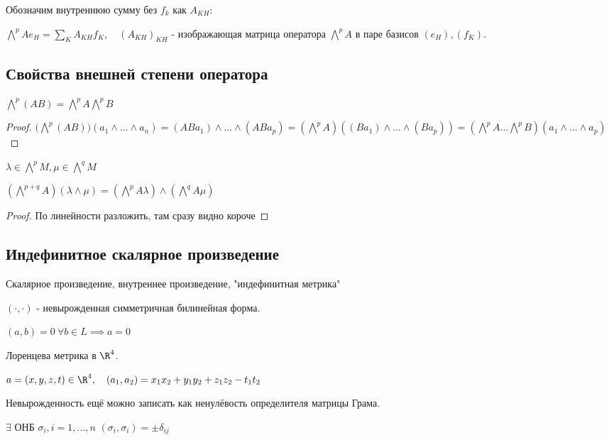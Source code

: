   Обозначим внутреннюю сумму без $f_k$ как $A_{KH}$:

  $\bigwedge^p A e_H = \sum_K A_{KH}f_K, \quad (A_{KH})_{KH}$ - изображающая матрица оператора $\bigwedge^p A$ в паре базисов $(e_H), (f_K)$.

  \subsection*{Свойства внешней степени оператора}

  \begin{proposition}
    $\bigwedge^p(AB) = \bigwedge^pA\bigwedge^pB$
  \end{proposition}
  \begin{proof}
    $\big(\bigwedge^p(AB)\big)(a_1 \land \dotsc \land a_n) = (ABa_1) \land \dotsc \land (ABa_p) = 
    (\bigwedge^pA)((Ba_1)\land \dotsc \land (Ba_p)) = (\bigwedge^pA \dotsc \bigwedge^p B)(a_1 \land \dotsc \land a_p)$
  \end{proof}
  \begin{proposition}
    $\lambda \in \bigwedge^pM, \mu \in \bigwedge^qM$
    
    $(\bigwedge^{p+q}A)(\lambda\land\mu) = (\bigwedge^pA\lambda)\land(\bigwedge^qA\mu)$
  \end{proposition}
  \begin{proof}
    По линейности разложить, там сразу видно короче
  \end{proof}

  \subsection*{Индефинитное скалярное произведение}

  Скалярное произведение, внутреннее произведение, "индефинитная метрика"

  $(\cdot, \cdot)$ - невырожденная симметричная билинейная форма.
  
  $(a,b) =0 \ \forall b \in L \implies a = 0$

  \setcounter{illustration}{0}
  \begin{illustration}
    Лоренцева метрика в $\R^4$.

    $a = (x,y,z,t) \in \R^4, \quad (a_1, a_2) = x_1x_2 + y_1y_2 + z_1z_2 - t_1t_2$
  \end{illustration}

  Невырожденность ещё можно записать как ненулёвость определителя матрицы Грама.

  $\exists$ ОНБ $\sigma_i, i = 1, \dotsc, n$ \quad $(\sigma_i, \sigma_i) = \pm \delta_{ij}$

